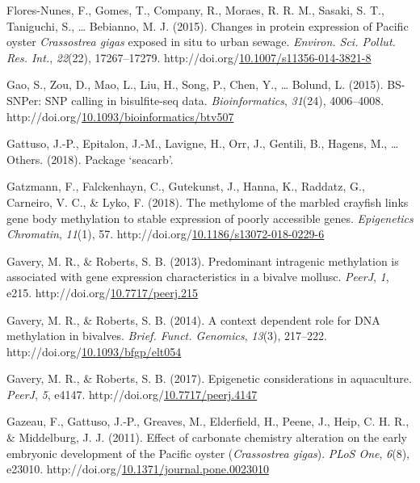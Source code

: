 \documentclass [11pt, proquest] {uwthesis}[2015/03/03]
\newlength{\cslhangindent}
\newenvironment{CSLReferences}%
{\setlength{\parindent}{0pt}%
\everypar{\setlength{\hangindent}{\cslhangindent}}\ignorespaces}%
{\par}
\begin{document}
\begin{CSLReferences}{1}{0}
\leavevmode\hypertarget{ref-Flores-Nunes2015}{}%
Flores-Nunes, F., Gomes, T., Company, R., Moraes, R. R. M., Sasaki, S. T., Taniguchi, S., \ldots{} Bebianno, M. J. (2015). {Changes in protein expression of Pacific oyster \emph{Crassostrea gigas} exposed in situ to urban sewage}. \emph{Environ. Sci. Pollut. Res. Int.}, \emph{22}(22), 17267--17279. http://doi.org/\href{https://doi.org/10.1007/s11356-014-3821-8}{10.1007/s11356-014-3821-8}

\leavevmode\hypertarget{ref-Gao2015}{}%
Gao, S., Zou, D., Mao, L., Liu, H., Song, P., Chen, Y., \ldots{} Bolund, L. (2015). {BS-SNPer: SNP calling in bisulfite-seq data}. \emph{Bioinformatics}, \emph{31}(24), 4006--4008. http://doi.org/\href{https://doi.org/10.1093/bioinformatics/btv507}{10.1093/bioinformatics/btv507}

\leavevmode\hypertarget{ref-Gattuso2018}{}%
Gattuso, J.-P., Epitalon, J.-M., Lavigne, H., Orr, J., Gentili, B., Hagens, M., \ldots{} Others. (2018). {Package {`seacarb'}}.

\leavevmode\hypertarget{ref-Gatzmann2018}{}%
Gatzmann, F., Falckenhayn, C., Gutekunst, J., Hanna, K., Raddatz, G., Carneiro, V. C., \& Lyko, F. (2018). {The methylome of the marbled crayfish links gene body methylation to stable expression of poorly accessible genes}. \emph{Epigenetics Chromatin}, \emph{11}(1), 57. http://doi.org/\href{https://doi.org/10.1186/s13072-018-0229-6}{10.1186/s13072-018-0229-6}

\leavevmode\hypertarget{ref-Gavery2013}{}%
Gavery, M. R., \& Roberts, S. B. (2013). {Predominant intragenic methylation is associated with gene expression characteristics in a bivalve mollusc}. \emph{PeerJ}, \emph{1}, e215. http://doi.org/\href{https://doi.org/10.7717/peerj.215}{10.7717/peerj.215}

\leavevmode\hypertarget{ref-Gavery2014}{}%
Gavery, M. R., \& Roberts, S. B. (2014). {A context dependent role for DNA methylation in bivalves}. \emph{Brief. Funct. Genomics}, \emph{13}(3), 217--222. http://doi.org/\href{https://doi.org/10.1093/bfgp/elt054}{10.1093/bfgp/elt054}

\leavevmode\hypertarget{ref-Gavery2017}{}%
Gavery, M. R., \& Roberts, S. B. (2017). {Epigenetic considerations in aquaculture}. \emph{PeerJ}, \emph{5}, e4147. http://doi.org/\href{https://doi.org/10.7717/peerj.4147}{10.7717/peerj.4147}

\leavevmode\hypertarget{ref-Gazeau2011}{}%
Gazeau, F., Gattuso, J.-P., Greaves, M., Elderfield, H., Peene, J., Heip, C. H. R., \& Middelburg, J. J. (2011). {Effect of carbonate chemistry alteration on the early embryonic development of the Pacific oyster (\emph{Crassostrea gigas})}. \emph{PLoS One}, \emph{6}(8), e23010. http://doi.org/\href{https://doi.org/10.1371/journal.pone.0023010}{10.1371/journal.pone.0023010}


\end{CSLReferences}
\end{document}

